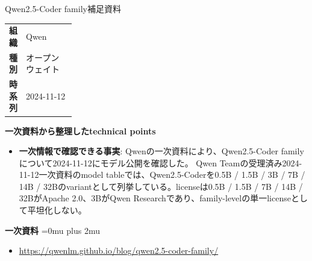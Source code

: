 \begin{technicalnote}{Qwen2.5-Coder family}{補足資料}
\begingroup
\begin{tabularx}{\linewidth}{@{}>{\bfseries}p{0.22\linewidth}X@{}}
組織 & Qwen \\
種別 & オープンウェイト \\
時系列 & 2024-11-12 \\
\end{tabularx}
\smallskip
{\bfseries 一次資料から整理したtechnical points}
\begin{itemize}[leftmargin=1.5em,itemsep=0.35em]
\item \textbf{一次情報で確認できる事実}: Qwenの一次資料により、Qwen2.5-Coder familyについて2024-11-12にモデル公開を確認した。 Qwen Teamの受理済み2024-11-12一次資料のmodel tableでは、Qwen2.5-Coderを0.5B / 1.5B / 3B / 7B / 14B / 32Bのvariantとして列挙している。licenseは0.5B / 1.5B / 7B / 14B / 32BがApache 2.0、3BがQwen Researchであり、family-levelの単一licenseとして平坦化しない。
\end{itemize}
\begin{minipage}{\linewidth}
\begin{samepage}
{\bfseries 一次資料}
\begingroup\sloppy
\Urlmuskip=0mu plus 2mu\relax
\begin{itemize}[leftmargin=1.5em,itemsep=0.25em]
\item {\scriptsize\url{https://qwenlm.github.io/blog/qwen2.5-coder-family/}}
\end{itemize}
\endgroup
\end{samepage}
\end{minipage}
\endgroup
\end{technicalnote}
\medskip

